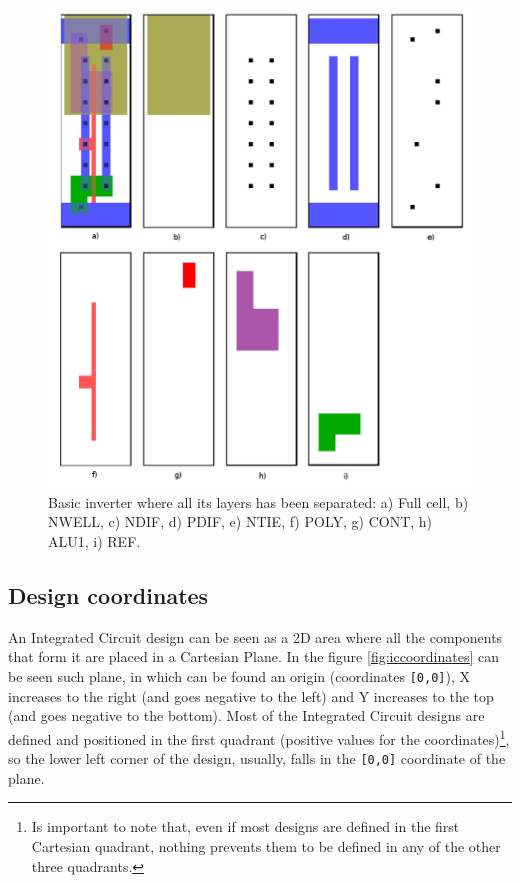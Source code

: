 \documentclass[11pt,twoside,openany,x11names,svgnames]{memoir}
\begin{document}
\begin{figure}
	\centering
	\includegraphics[scale=0.2, clip=true, trim= 0pt 0pt 0pt 0pt]{images/chapter03-image01}
	\caption{Basic inverter where all its layers has been separated: a) Full cell, b) NWELL, c) NDIF, d) PDIF, e) NTIE, f) POLY, g) CONT, h) ALU1, i) REF.}
	\label{fig:layers}
\end{figure}

\subsection{Design coordinates}\label{Design-coordinates}

An Integrated Circuit design can be seen as a 2D area where all the components that form it are placed in a Cartesian Plane. In the figure \ref{fig:iccoordinates} can be seen such plane, in which can be found an origin (coordinates \texttt{[0,0]}), X increases to the right (and goes negative to the left) and Y increases to the top (and goes negative to the bottom). Most of the Integrated Circuit designs are defined and positioned in the first quadrant (positive values for the coordinates)\footnote{Is important to note that, even if most designs are defined in the first Cartesian quadrant, nothing prevents them to be defined in any of the other three quadrants.}, so the lower left corner of the design, usually, falls in the \texttt{[0,0]} coordinate of the plane.
\end{document}
